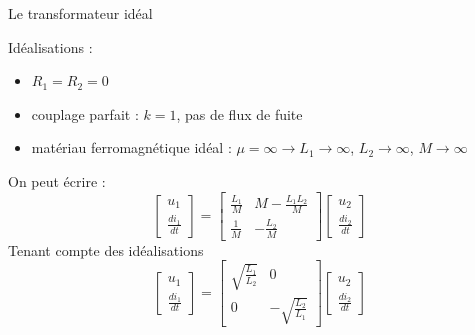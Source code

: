 \begin{frame}{Le transformateur idéal}
	
	Idéalisations :
	\begin{itemize}
		\item $R_1=R_2=0$
		\item couplage parfait : $k=1$, pas de flux de fuite
		\item matériau ferromagnétique idéal : $\mu=\infty \rightarrow
		L_1\rightarrow \infty$, $L_2\rightarrow \infty$, $M\rightarrow \infty$
	\end{itemize}
	
	On peut écrire :
	{\[\left[
		\begin{array}{c}
		u_1\\
		\frac{di_1}{dt}
		\end{array}\right] = \left[
		\begin{array}{cc}
		\frac{L_1}{M} & M-\frac{L_1L_2}{M} \\
		\frac{1}{M} & -\frac{L_2}{M}
		\end{array}\right]
		\left[
		\begin{array}{c}
		u_2\\ \frac{di_2}{dt}
		\end{array}\right]\]}
	Tenant compte des idéalisations
	{\[\left[
		\begin{array}{c}
		u_1\\
		\frac{di_1}{dt}
		\end{array}\right] = \left[
		\begin{array}{cc}
		\sqrt{\frac{L_1}{L_2}}  & 0\\
		0 & -\sqrt{\frac{L_2}{L_1}}
		\end{array}\right]
		\left[
		\begin{array}{c}
		u_2\\ \frac{di_2}{dt}
		\end{array}\right]
		\]}
\end{frame}


